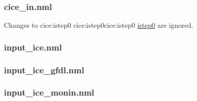 \documentclass[11pt]{article}
\makeatletter
\newcommand*{\make@hex@label}[1]{%
  \def\hex@label{#1}%
  \@onelevel@sanitize\hex@label
  \EdefEscapeHex\hex@label{\hex@label}%
}
\newcommand*{\hexhyperlink}[2]{%
  \make@hex@label{#1}%
  \hyperlink{\hex@label}{#2}%
}
\newcommand{\cicelink}[2]{\hexhyperlink{cice:#2}{#1}}
\newcommand{\paramsty}[1]{\textsf{#1}}
\newcommand{\cice}[1]{\paramsty{\cicelink{#1}{#1}}\index{\paramsty{#1}}}
\newcommand{\nml}[1]{{\footnotesize\textsf{}}}
\makeatother
\begin{document}
\subsubsection{cice\_in.nml}\label{S:cice-in-namelist-diff}
Changes to \cice{istep0} are ignored. 
\nml{cice_in_nml_1deg_diff.tex}
\nml{cice_in_nml_025deg_diff.tex}
\nml{cice_in_nml_01deg_diff.tex}
\subsubsection{input\_ice.nml}
\nml{input_ice_nml_1deg_diff.tex}
\nml{input_ice_nml_025deg_diff.tex}
\nml{input_ice_nml_01deg_diff.tex}
\subsubsection{input\_ice\_gfdl.nml}
\nml{input_ice_gfdl_nml_1deg_diff.tex}
\nml{input_ice_gfdl_nml_025deg_diff.tex}
\nml{input_ice_gfdl_nml_01deg_diff.tex}
\subsubsection{input\_ice\_monin.nml}
\nml{input_ice_monin_nml_1deg_diff.tex}
\nml{input_ice_monin_nml_025deg_diff.tex}
\nml{input_ice_monin_nml_01deg_diff.tex}
\end{document}
